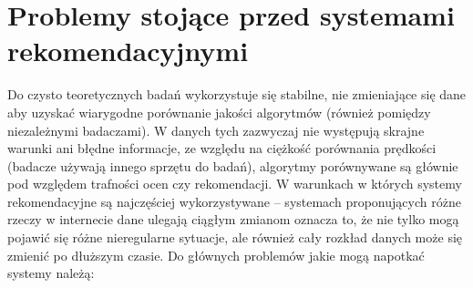 \documentclass{pracamgr}
\begin{document}
  \section{Problemy stojące przed systemami rekomendacyjnymi}
   Do czysto teoretycznych badań wykorzystuje się stabilne, nie zmieniające się dane aby uzyskać wiarygodne porównanie jakości algorytmów
   (również pomiędzy niezależnymi badaczami). W danych tych zazwyczaj nie występują skrajne warunki ani błędne informacje,
   ze względu na ciężkość porównania prędkości (badacze używają innego sprzętu do badań),
   algorytmy porównywane są głównie pod względem trafności ocen czy rekomendacji.\newline
   W warunkach w których systemy rekomendacyjne są najczęściej wykorzystywane -- systemach proponujących różne rzeczy w internecie dane ulegają ciągłym zmianom
   oznacza to, że nie tylko mogą pojawić się różne nieregularne sytuacje, ale również cały rozkład danych może się zmienić po dłuższym czasie.
   Do głównych problemów jakie mogą napotkać systemy należą:
\end{document}
